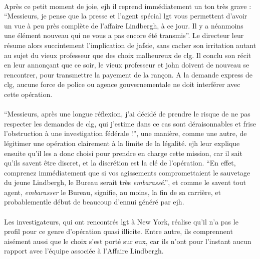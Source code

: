 \paragraph{} Après ce petit moment de joie, \gls{ejh} il reprend immédiatement un ton très grave : ``Messieurs, je pense que la presse et l'agent
spécial \gls{lgt} vous permettent d'avoir un vue à peu près complète de l'affaire Lindbergh, à ce jour. Il y a néanmoins une élément nouveau qui 
ne vous a pas encore été transmis''. Le directeur leur résume alors succintement l'implication de \gls{jafsie}, sans cacher son irritation autant
au sujet du vieux professeur que des choix malheureux de \gls{clg}. Il conclu son récit en leur annonçant que ce soir, le vieux professeur et
 \gls{john} doivent de nouveau se rencontrer, pour transmettre la payement de la rançon. A la demande express de \gls{clg}, aucune force de police
ou agence gouvernementale ne doit interférer avec cette opération.

\paragraph{} ``Messieurs, après une longue réflexion, j'ai décidé de prendre le risque de ne pas respecter les demandes de \gls{clg}, qui j'estime
dans ce cas sont déraisonnables et frise l'obstruction à une investigation fédérale !'', une manière, comme une autre, de légitimer une opération
clairement à la limite de la légalité. \gls{ejh} leur explique ensuite qu'il les a donc choisi pour prendre en charge cette mission, car il sait
qu'ils savent être discret, et la discrétion est la clé de l'opération. ``En effet, comprenez immédiatement que si vos agissements compromettaient
le sauvetage du jeune Lindbergh, le Bureau serait très \emph{embarassé}.'', et comme le savent tout agent, \emph{embarasser} le Bureau, signifie,
au moins, la fin de sa carrière, et probablementle début de beaucoup d'ennui généré par \gls{ejh}.

\paragraph{} Les investigateurs, qui ont rencontrés \gls{lgt} à New York, réalise qu'il n'a pas le profil pour ce genre d'opération quasi illicite.
Entre autre, ils comprennent aisément aussi que le choix s'est porté sur eux, car ils n'ont pour 
l'instant aucun rapport avec l'équipe associée à l'Affaire Lindbergh.

